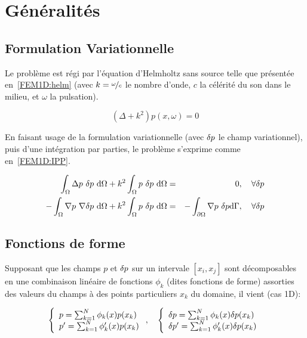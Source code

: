 
\section{Généralités}
\label{FEM1D:subsection:linear}

\subsection{Formulation Variationnelle}

Le problème est régi par l'équation d'Helmholtz sans source telle que présentée en~\eqref{FEM1D:helm} (avec $k =
\nicefrac{\omega}{c}$ le nombre d'onde, $c$ la célérité du son dans le milieu, et $\omega$ la pulsation).

\begin{equation}
	(\Delta + k^2)p(x,\omega) = 0 \label{FEM1D:helm}
\end{equation}

En faisant usage de la formulation variationnelle (avec $\delta p$ le champ variationnel), puis d'une intégration par
parties, le problème s'exprime comme en~\eqref{FEM1D:IPP}.

\begin{eqnarray}
	\int_\Omega \Delta p~\delta p~\mathrm{d}\Omega + k^2 \int_\Omega p~\delta p~\mathrm{d}\Omega & =  & 0,\quad \forall\delta p\notag\\
	- \int_\Omega \nabla p~\nabla \delta p ~\mathrm{d}\Omega + k^2\int_\Omega p~\delta p~\mathrm{d}\Omega & = & -\int_{\partial\Omega}\nabla p~\delta p\mathrm{d}\Gamma, \quad \forall\delta p \label{FEM1D:IPP}
\end{eqnarray}

\subsection{Fonctions de forme}

Supposant que les champs $p$ et $\delta p$ sur un intervale $[x_i, x_j]$ sont décomposables en une combinaison linéaire de
fonctions $\phi_k$ (dites fonctions de forme) assorties des valeurs du champs à des points particuliers $x_k$ du domaine, il
vient (cas 1D):

\begin{equation}
	\left\{\begin{array}{l}
		p = \sum_{k=1}^N \phi_k(x)p(x_k)\\
		p' = \sum_{k=1}^N \phi_k'(x)p(x_k)\\
	\end{array}\right., \quad
	\left\{\begin{array}{l}
		\delta p = \sum_{k=1}^N \phi_k(x)\delta p(x_k)\\
		\delta p' = \sum_{k=1}^N \phi_k'(x)\delta p(x_k)\\
	\end{array}\right.\label{FEM1D:shapefun}
\end{equation}

